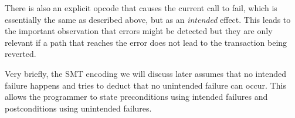 There is also an explicit opcode that causes the current call to fail, which is
essentially the same as described above, but as an \emph{intended} effect.
%
This leads to the important observation that errors might be detected but they
are only relevant if a path that reaches the error does not lead to the
transaction being reverted.

Very briefly, the SMT encoding we will discuss later assumes that no intended
failure happens and tries to deduct that no unintended failure can occur. This
allows the programmer to state preconditions using intended failures and
postconditions using unintended failures.
